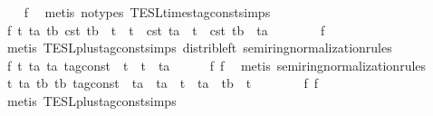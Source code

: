 \begin{isabellebody}
\ \ \isamarkupfalse%
\ f{}\ \isamarkupfalse%
\ {\isacharparenleft}metis\ {\isacharparenleft}no{\isacharunderscore}types{\isacharparenright}\ TESL{\isachardot}times{\isacharunderscore}tag{\isacharunderscore}const{\isachardot}simps{\isacharparenright}\isanewline
\ \ \ \ \isamarkupfalse%
\ \isamarkupfalse%
\ f{}{\isacharcolon}\ {\isachardoublequoteopen}{\isasymforall}t\ ta\ tb{\isachardot}\ {\isasymtau}\isactrlsub c\isactrlsub s\isactrlsub t\ {\isacharparenleft}tb{\isacharcolon}{\isacharcolon}{\isacharprime}{\isasymtau}{\isacharparenright}\ {\isacharasterisk}\ t\ {\isacharplus}\ t\ {\isacharasterisk}\ {\isasymtau}\isactrlsub c\isactrlsub s\isactrlsub t\ ta\ {\isacharequal}\ t\ {\isacharasterisk}\ {\isasymtau}\isactrlsub c\isactrlsub s\isactrlsub t\ {\isacharparenleft}tb\ {\isacharplus}\ ta{\isacharparenright}{\isachardoublequoteclose}\isanewline
\ \ \ \ \ \ \isamarkupfalse%
\ f{}\ \isamarkupfalse%
\ {\isacharparenleft}metis\ TESL{\isachardot}plus{\isacharunderscore}tag{\isacharunderscore}const{\isachardot}simps\ distrib{\isacharunderscore}left\ semiring{\isacharunderscore}normalization{\isacharunderscore}rules{\isacharparenleft}{}{\isacharparenright}{\isacharparenright}\isanewline
\ \ \isamarkupfalse%
\ f{}{\isacharcolon}\ {\isachardoublequoteopen}{\isasymforall}t\ ta{\isachardot}\ {\isacharparenleft}ta{\isacharcolon}{\isacharcolon}{\isacharprime}{\isasymtau}\ tag{\isacharunderscore}const{\isacharparenright}\ {\isacharasterisk}\ t\ {\isacharequal}\ t\ {\isacharasterisk}\ ta{\isachardoublequoteclose}\isanewline
\ \ \ \ \isamarkupfalse%
\ f{}\ f{}\ \isamarkupfalse%
\ {\isacharparenleft}metis\ semiring{\isacharunderscore}normalization{\isacharunderscore}rules{\isacharparenleft}{}{\isacharparenright}{\isacharparenright}\isanewline
\ \ \ \ \isamarkupfalse%
\ {\isachardoublequoteopen}{\isasymforall}t\ ta\ tb{\isachardot}\ {\isacharparenleft}tb{\isacharcolon}{\isacharcolon}{\isacharprime}{\isasymtau}\ tag{\isacharunderscore}const{\isacharparenright}\ {\isacharasterisk}\ ta\ {\isacharplus}\ ta\ {\isacharasterisk}\ t\ {\isacharequal}\ ta\ {\isacharasterisk}\ {\isacharparenleft}tb\ {\isacharplus}\ t{\isacharparenright}{\isachardoublequoteclose}\isanewline
\ \ \ \ \ \ \isamarkupfalse%
\ f{}\ f{}\ \isamarkupfalse%
\ {\isacharparenleft}metis\ TESL{\isachardot}plus{\isacharunderscore}tag{\isacharunderscore}const{\isachardot}simps{\isacharparenright}\isanewline

\end{isabellebody}
